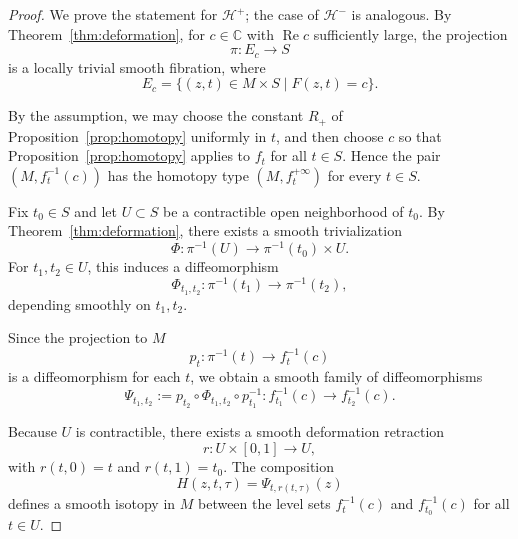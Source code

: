 \documentclass[11pt]{amsart}
\theoremstyle{plain}
\theoremstyle{definition}
\theoremstyle{remark}
\numberwithin{equation}{section}
\begin{document}
\begin{proof}
    We prove the statement for $\mathcal{H}^{+}$; the case of $\mathcal{H}^{-}$ is analogous.
    By Theorem~\ref{thm:deformation}, for $c \in \mathbb{C}$ with $\operatorname{Re} c$ sufficiently large, the projection
    \begin{equation}
        \pi : E_c \to S
    \end{equation}
    is a locally trivial smooth fibration, where
    \begin{equation}
        E_c = \{(z,t) \in M \times S \mid F(z,t) = c\}.
    \end{equation}

    By the assumption, we may choose the constant $R_+$ of Proposition~\ref{prop:homotopy} uniformly in $t$, and then choose $c$ so that Proposition~\ref{prop:homotopy} applies to $f_t$ for all $t \in S$.
    Hence the pair $(M, f_t^{-1}(c))$ has the homotopy type $(M, f_t^{+\infty})$ for every $t \in S$.

    Fix $t_0 \in S$ and let $U \subset S$ be a contractible open neighborhood of $t_0$.
    By Theorem~\ref{thm:deformation}, there exists a smooth trivialization
    \begin{equation}
        \Phi : \pi^{-1}(U) \longrightarrow \pi^{-1}(t_0) \times U.
    \end{equation}
    For $t_1,t_2 \in U$, this induces a diffeomorphism
    \begin{equation}
        \Phi_{t_1,t_2} : \pi^{-1}(t_1) \longrightarrow \pi^{-1}(t_2),
    \end{equation}
    depending smoothly on $t_1, t_2$.

    Since the projection to $M$
    \begin{equation}
        p_t : \pi^{-1}(t) \longrightarrow f_t^{-1}(c)
    \end{equation}
    is a diffeomorphism for each $t$, we obtain a smooth family of diffeomorphisms
    \begin{equation}
        \Psi_{t_1,t_2} := p_{t_2} \circ \Phi_{t_1,t_2} \circ p_{t_1}^{-1} : f_{t_1}^{-1}(c) \longrightarrow f_{t_2}^{-1}(c).
    \end{equation}

    Because $U$ is contractible, there exists a smooth deformation retraction
    \begin{equation}
        r : U \times [0,1] \longrightarrow U,
    \end{equation}
    with $r(t,0) = t$ and $r(t,1) = t_0$.
    The composition
    \begin{equation}
        H(z,t,\tau) = \Psi_{t, r(t,\tau)}(z)
    \end{equation}
    defines a smooth isotopy in $M$ between the level sets $f_t^{-1}(c)$ and $f_{t_0}^{-1}(c)$ for all $t \in U$.


\end{proof}
\end{document}
